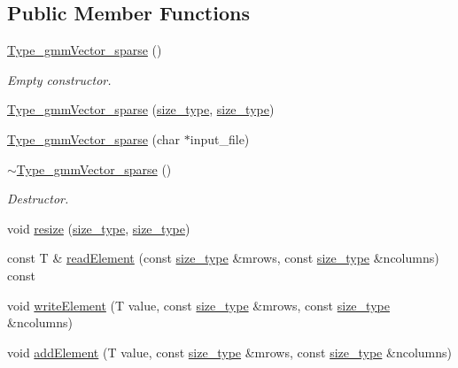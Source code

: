 \subsection*{Public Member Functions}
\begin{DoxyCompactItemize}
\item 
\hyperlink{classlmx_1_1Type__gmmVector__sparse_aca5ef746e665f2cbceab490b784aeffe}{Type\-\_\-gmm\-Vector\-\_\-sparse} ()
\begin{DoxyCompactList}\small\item\em Empty constructor. \end{DoxyCompactList}\item 
\hyperlink{classlmx_1_1Type__gmmVector__sparse_a1046b257443dfce605e0b381d1dc2916}{Type\-\_\-gmm\-Vector\-\_\-sparse} (\hyperlink{lmx__mat__data_8h_a49b489a408a211a90e766329c0732d7b}{size\-\_\-type}, \hyperlink{lmx__mat__data_8h_a49b489a408a211a90e766329c0732d7b}{size\-\_\-type})
\item 
\hyperlink{classlmx_1_1Type__gmmVector__sparse_af8b97536724aa2b7a4290411bfb32ade}{Type\-\_\-gmm\-Vector\-\_\-sparse} (char $\ast$input\-\_\-file)
\item 
\hyperlink{classlmx_1_1Type__gmmVector__sparse_abc2ed5b7b7f1ce44f263b72431c22211}{$\sim$\-Type\-\_\-gmm\-Vector\-\_\-sparse} ()
\begin{DoxyCompactList}\small\item\em Destructor. \end{DoxyCompactList}\item 
void \hyperlink{classlmx_1_1Type__gmmVector__sparse_a4ce5a2d661451dfad3d61dcd6cceaa66}{resize} (\hyperlink{lmx__mat__data_8h_a49b489a408a211a90e766329c0732d7b}{size\-\_\-type}, \hyperlink{lmx__mat__data_8h_a49b489a408a211a90e766329c0732d7b}{size\-\_\-type})
\item 
const T \& \hyperlink{classlmx_1_1Type__gmmVector__sparse_ac0079f08940635a93f1158727deb3049}{read\-Element} (const \hyperlink{lmx__mat__data_8h_a49b489a408a211a90e766329c0732d7b}{size\-\_\-type} \&mrows, const \hyperlink{lmx__mat__data_8h_a49b489a408a211a90e766329c0732d7b}{size\-\_\-type} \&ncolumns) const 
\item 
void \hyperlink{classlmx_1_1Type__gmmVector__sparse_ad5041be88871fcb7fc0f78303e184c13}{write\-Element} (T value, const \hyperlink{lmx__mat__data_8h_a49b489a408a211a90e766329c0732d7b}{size\-\_\-type} \&mrows, const \hyperlink{lmx__mat__data_8h_a49b489a408a211a90e766329c0732d7b}{size\-\_\-type} \&ncolumns)
\item 
void \hyperlink{classlmx_1_1Type__gmmVector__sparse_a2362b786de94b584ee30b07b5a6e2951}{add\-Element} (T value, const \hyperlink{lmx__mat__data_8h_a49b489a408a211a90e766329c0732d7b}{size\-\_\-type} \&mrows, const \hyperlink{lmx__mat__data_8h_a49b489a408a211a90e766329c0732d7b}{size\-\_\-type} \&ncolumns)

\end{DoxyCompactItemize}
